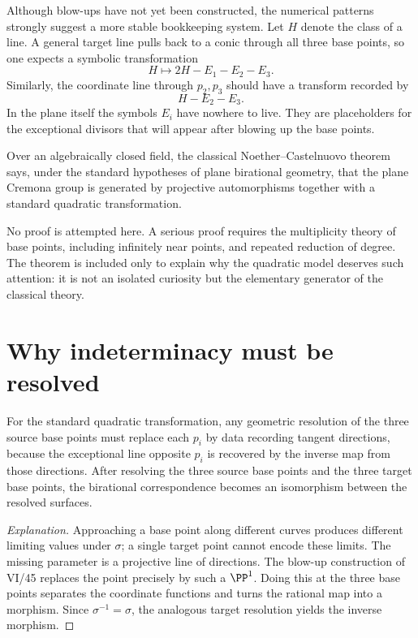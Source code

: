 Although blow-ups have not yet been constructed, the numerical patterns strongly suggest a more stable bookkeeping system.  Let \(H\) denote the class of a line.  A general target line pulls back to a conic through all three base points, so one expects a symbolic transformation
\[
  H\longmapsto 2H-E_1-E_2-E_3.
\]
Similarly, the coordinate line through \(p_2,p_3\) should have a transform recorded by
\[
  H-E_2-E_3.
\]
In the plane itself the symbols \(E_i\) have nowhere to live.  They are placeholders for the exceptional divisors that will appear after blowing up the base points.

\begin{theorem}\label{thm:vi44-noether-castelnuovo-preview}
Over an algebraically closed field, the classical Noether--Castelnuovo theorem says, under the standard hypotheses of plane birational geometry, that the plane Cremona group is generated by projective automorphisms together with a standard quadratic transformation.
\end{theorem}

No proof is attempted here.  A serious proof requires the multiplicity theory of base points, including infinitely near points, and repeated reduction of degree.  The theorem is included only to explain why the quadratic model deserves such attention: it is not an isolated curiosity but the elementary generator of the classical theory.



\section{Why indeterminacy must be resolved}

\begin{proposition}\label{prop:vi44-resolution-preview}
For the standard quadratic transformation, any geometric resolution of the three source base points must replace each \(p_i\) by data recording tangent directions, because the exceptional line opposite \(p_i\) is recovered by the inverse map from those directions.  After resolving the three source base points and the three target base points, the birational correspondence becomes an isomorphism between the resolved surfaces.
\end{proposition}

\begin{proof}[Explanation]
Approaching a base point along different curves produces different limiting values under \(\sigma\); a single target point cannot encode these limits.  The missing parameter is a projective line of directions.  The blow-up construction of VI/45 replaces the point precisely by such a \(\PP^1\).  Doing this at the three base points separates the coordinate functions and turns the rational map into a morphism.  Since \(\sigma^{-1}=\sigma\), the analogous target resolution yields the inverse morphism.
\end{proof}

